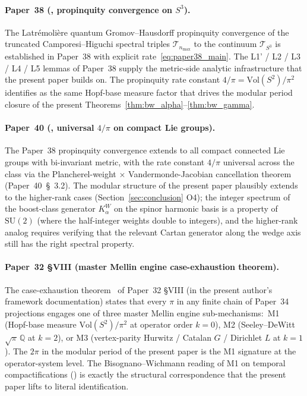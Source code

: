 \documentclass[11pt,a4paper]{article}
\theoremstyle{plain}
\theoremstyle{definition}
\newcommand{\nmax}{n_{\max}}
\newcommand{\sthree}{S^{3}}
\newcommand{\Tcal}{\mathcal{T}}
\newcommand{\Q}{\mathbb{Q}}
\newcommand{\SU}{\mathrm{SU}}
\newcommand{\Vol}{\mathrm{Vol}}
\begin{document}
\paragraph{Paper~38 (\cite{paper38}, propinquity convergence on
$\sthree$).}
The Latr\'emoli\`ere quantum Gromov--Hausdorff propinquity convergence
of the truncated Camporesi--Higuchi spectral triples $\Tcal_{\nmax}$
to the continuum $\Tcal_{\sthree}$ is established in Paper~38 with
explicit rate~\eqref{eq:paper38_main}. The L1' / L2 / L3 / L4 / L5
lemmas of Paper~38 supply the metric-side analytic infrastructure
that the present paper builds on. The propinquity rate constant
$4/\pi = \Vol(S^2)/\pi^2$ identifies as the same Hopf-base measure
factor that drives the modular period closure of the present
Theorems~\ref{thm:bw_alpha}--\ref{thm:bw_gamma}.

\paragraph{Paper~40 (\cite{paper40_unified}, universal $4/\pi$ on
compact Lie groups).}
The Paper~38 propinquity convergence extends to all compact connected
Lie groups with bi-invariant metric, with the rate constant $4/\pi$
universal across the class via the Plancherel-weight $\times$
Vandermonde-Jacobian cancellation theorem (Paper~40~\S~3.2). The
modular structure of the present paper plausibly extends to the
higher-rank cases (Section~\ref{sec:conclusion} O4); the integer
spectrum of the boost-class generator $K_\alpha^W$ on the spinor
harmonic basis is a property of $\SU(2)$ (where the half-integer
weights double to integers), and the higher-rank analog requires
verifying that the relevant Cartan generator along the wedge axis
still has the right spectral property.

\paragraph{Paper~32 \S VIII (master Mellin engine case-exhaustion
theorem).}
The case-exhaustion theorem~\cite[Thm.~thm:pi\_source\_case\_exhaustion]{paper32}
of Paper~32 \S VIII (in the present author's framework documentation)
states that every $\pi$ in any finite chain of Paper~34 projections
engages one of three master Mellin engine sub-mechanisms:\ M1 (Hopf-base
measure $\Vol(S^2)/\pi^2$ at operator order $k = 0$), M2 (Seeley--DeWitt
$\sqrt{\pi}\, \Q$ at $k = 2$), or M3 (vertex-parity Hurwitz / Catalan
$G$ / Dirichlet $L$ at $k = 1$). The $2\pi$ in the modular period of
the present paper is the M1 signature at the operator-system level.
The Bisognano--Wichmann reading of M1 on temporal compactifications
(\cite[Rem.~rem:bisognano\_wichmann\_reading]{paper32}) is exactly the
structural correspondence that the present paper lifts to literal
identification.
\end{document}
